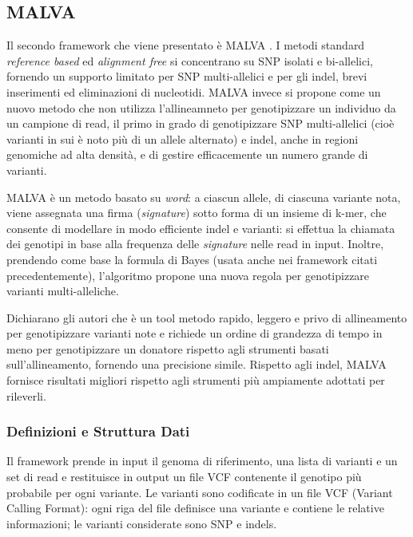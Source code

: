 \documentclass[../main.tex]{subfiles}
\begin{document}
\subsection{MALVA}
\label{malva}

Il secondo framework che viene presentato è MALVA \cite{bernardini2019malva}. I metodi standard \textit{reference based} ed \textit{alignment free} si concentrano su SNP isolati e bi-allelici, fornendo un supporto limitato per SNP multi-allelici e per gli indel, brevi inserimenti ed eliminazioni di nucleotidi. MALVA invece si propone come un nuovo metodo che non utilizza l'allineamneto per genotipizzare un individuo da un campione di read, il primo in grado di genotipizzare SNP multi-allelici (cioè varianti in sui è noto più di un allele alternato) e indel, anche in regioni genomiche ad alta densità, e di gestire efficacemente un numero grande di varianti. 

MALVA è un metodo basato su \textit{word}: a ciascun allele, di ciascuna variante nota, viene assegnata una firma (\textit{signature}) sotto forma di un insieme di k-mer, che consente di modellare in modo efficiente indel e varianti: si effettua la chiamata dei genotipi in base alla frequenza delle \textit{signature} nelle read in input. Inoltre, prendendo come base la formula di Bayes (usata anche nei framework citati precedentemente), l'algoritmo propone una nuova regola per genotipizzare varianti multi-alleliche.

Dichiarano gli autori che è un tool metodo rapido, leggero e privo di allineamento per genotipizzare varianti note e richiede un ordine di grandezza di tempo in meno per genotipizzare un donatore rispetto agli strumenti basati sull'allineamento, fornendo una precisione simile. Rispetto agli indel, MALVA fornisce risultati migliori rispetto agli strumenti più ampiamente adottati per rileverli.


\subsubsection{Definizioni e Struttura Dati}

Il framework prende in input il genoma di riferimento, una lista di varianti e un set di read e restituisce in output un file VCF contenente il genotipo più probabile per ogni variante. Le varianti sono codificate in un file VCF (Variant Calling Format): ogni riga del file definisce una variante e contiene le relative informazioni; le varianti considerate sono SNP e indels.
\end{document}
